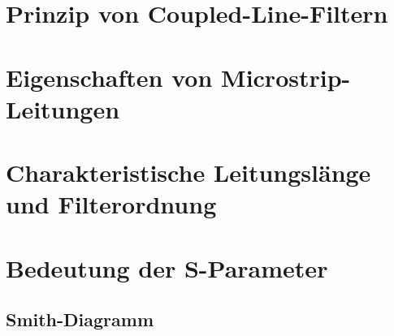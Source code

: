 \section{Prinzip von Coupled-Line-Filtern}
\section{Eigenschaften von Microstrip-Leitungen}
\section{Charakteristische Leitungslänge und Filterordnung}
\section{Bedeutung der S-Parameter}
\subsection{Smith-Diagramm}

\clearpage